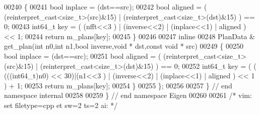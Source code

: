 \begin{DoxyCode}
00240       \{
00241           \textcolor{keywordtype}{bool} inplace = (dst==src);
00242           \textcolor{keywordtype}{bool} aligned = ( (\textcolor{keyword}{reinterpret\_cast<}\textcolor{keywordtype}{size\_t}\textcolor{keyword}{>}(src)&15) | (\textcolor{keyword}{reinterpret\_cast<}\textcolor{keywordtype}{size\_t}\textcolor{keyword}{>}(dst)&15) ) == 0;
00243           int64\_t key = ( (nfft<<3 ) | (inverse<<2) | (inplace<<1) | aligned ) << 1;
00244           \textcolor{keywordflow}{return} m\_plans[key];
00245       \}
00246 
00247       \textcolor{keyword}{inline}
00248       PlanData & get\_plan(\textcolor{keywordtype}{int} n0,\textcolor{keywordtype}{int} n1,\textcolor{keywordtype}{bool} inverse,\textcolor{keywordtype}{void} * dst,\textcolor{keyword}{const} \textcolor{keywordtype}{void} * src)
00249       \{
00250           \textcolor{keywordtype}{bool} inplace = (dst==src);
00251           \textcolor{keywordtype}{bool} aligned = ( (\textcolor{keyword}{reinterpret\_cast<}\textcolor{keywordtype}{size\_t}\textcolor{keyword}{>}(src)&15) | (\textcolor{keyword}{reinterpret\_cast<}\textcolor{keywordtype}{size\_t}\textcolor{keyword}{>}(dst)&15) ) == 0;
00252           int64\_t key = ( ( (((int64\_t)n0) << 30)|(n1<<3 ) | (inverse<<2) | (inplace<<1) | aligned ) << 1 )
       + 1;
00253           \textcolor{keywordflow}{return} m\_plans[key];
00254       \}
00255   \};
00256 
00257 \} \textcolor{comment}{// end namespace internal}
00258 
00259 \} \textcolor{comment}{// end namespace Eigen}
00260 
00261 \textcolor{comment}{/* vim: set filetype=cpp et sw=2 ts=2 ai: */}
\end{DoxyCode}

